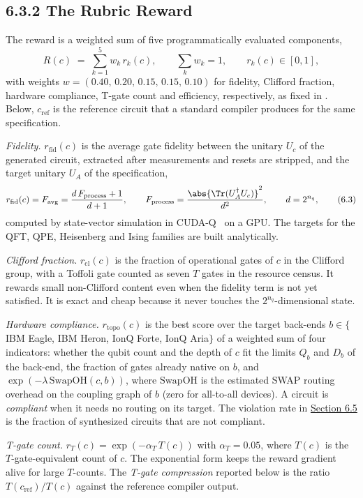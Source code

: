 \documentclass{report}
\theoremstyle{plain}
\theoremstyle{definition}
\theoremstyle{remark}
\begin{document}
\subsection{6.3.2 The Rubric Reward}\label{sec:syn:rubric}

The reward is a weighted sum of five programmatically evaluated components,
\hypertarget{eq:syn:rubric}{}\[
  R(c) \;=\; \sum_{k=1}^{5} w_k\, r_k(c),\qquad \sum_k w_k = 1,\qquad r_k(c)\in[0,1],
\tag{6.2}\]
with weights $w=(0.40,\,0.20,\,0.15,\,0.15,\,0.10)$ for fidelity, Clifford fraction, hardware compliance, T-gate count and efficiency, respectively, as fixed in \cite{guo2026rubriq}. Below, $c_{\mathrm{ref}}$ is the reference circuit that a standard compiler produces for the same specification.

\emph{Fidelity.} $r_{\mathrm{fid}}(c)$ is the average gate fidelity between the unitary $U_c$ of the generated circuit, extracted after measurements and resets are stripped, and the target unitary $U_A$ of the specification,
\hypertarget{eq:syn:fid}{}\[
  r_{\mathrm{fid}}(c) = F_{\mathrm{avg}} = \frac{d\,F_{\mathrm{process}}+1}{d+1},\qquad F_{\mathrm{process}} = \frac{\abs{\Tr(U_A^{\dagger}U_c)}^{2}}{d^{2}},\qquad d=2^{n_q},
\tag{6.3}\]
computed by state-vector simulation in CUDA-Q~\cite{kim2023cudaquantum} on a GPU. The targets for the QFT, QPE, Heisenberg and Ising families are built analytically.

\emph{Clifford fraction.} $r_{\mathrm{cl}}(c)$ is the fraction of operational gates of $c$ in the Clifford group, with a Toffoli gate counted as seven $T$ gates in the resource census. It rewards small non-Clifford content even when the fidelity term is not yet satisfied. It is exact and cheap because it never touches the $2^{n_q}$-dimensional state.

\emph{Hardware compliance.} $r_{\mathrm{topo}}(c)$ is the best score over the target back-ends $b\in\{$IBM Eagle, IBM Heron, IonQ Forte, IonQ Aria$\}$ of a weighted sum of four indicators: whether the qubit count and the depth of $c$ fit the limits $Q_b$ and $D_b$ of the back-end, the fraction of gates already native on $b$, and $\exp(-\lambda\,\mathrm{SwapOH}(c,b))$, where $\mathrm{SwapOH}$ is the estimated SWAP routing overhead on the coupling graph of $b$ (zero for all-to-all devices). A circuit is \emph{compliant} when it needs no routing on its target. The violation rate in \hyperref[sec:syn:results]{Section 6.5} is the fraction of synthesized circuits that are not compliant.

\emph{T-gate count.} $r_{T}(c)=\exp(-\alpha_T\,T(c))$ with $\alpha_T=0.05$, where $T(c)$ is the $T$-gate-equivalent count of $c$. The exponential form keeps the reward gradient alive for large $T$-counts. The \emph{T-gate compression} reported below is the ratio $T(c_{\mathrm{ref}})/T(c)$ against the reference compiler output.
\end{document}
